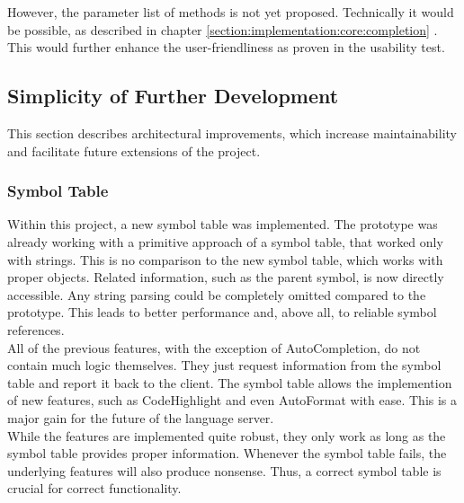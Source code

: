 However, the parameter list of methods is not yet proposed.
Technically it would be possible, as described in chapter
\ref{section:implementation:core:completion} \textendash{} .
This would further enhance the user-friendliness as proven in the usability test.

\subsection{Simplicity of Further Development}
This section describes architectural improvements,
which increase maintainability and facilitate future extensions of the project.

\subsubsection{Symbol Table}
Within this project, a new symbol table was implemented.
The prototype was already working with a primitive approach of a symbol table, that worked only with strings.
This is no comparison to the new symbol table, which works with proper objects.
Related information, such as the parent symbol, is now directly accessible.
Any string parsing could be completely omitted compared to the prototype.
This leads to better performance and, above all, to reliable symbol references.\\

All of the previous features, with the exception of AutoCompletion, do not contain much logic themselves.
They just request information from the symbol table and report it back to the client.
The symbol table allows the implemention of new features, such as CodeHighlight and even AutoFormat with ease.
This is a major gain for the future of the language server.\\


While the features are implemented quite robust, they only work as long as the symbol table provides proper information.
Whenever the symbol table fails, the underlying features will also produce nonsense.
Thus, a correct symbol table is crucial for correct functionality.\\

